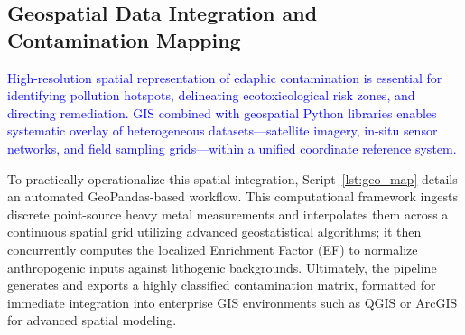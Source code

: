 \documentclass[environments,article,submit,pdftex,moreauthors]{Definitions/mdpi}
\begin{document}
\subsection{Geospatial Data Integration and Contamination Mapping}\label{sec2.3}

\textcolor{blue}{High-resolution spatial representation of edaphic contamination is essential for identifying pollution hotspots, delineating ecotoxicological risk zones, and directing remediation. GIS combined with geospatial Python libraries enables systematic overlay of heterogeneous datasets---satellite imagery, in-situ sensor networks, and field sampling grids---within a unified coordinate reference system.} 

To practically operationalize this spatial integration, Script~\ref{lst:geo_map} details an automated GeoPandas-based workflow. This computational framework ingests discrete point-source heavy metal measurements and interpolates them across a continuous spatial grid utilizing advanced geostatistical algorithms; it then concurrently computes the localized Enrichment Factor (EF) to normalize anthropogenic inputs against lithogenic backgrounds. Ultimately, the pipeline generates and exports a highly classified contamination matrix, formatted for immediate integration into enterprise GIS environments such as QGIS or ArcGIS for advanced spatial modeling.
\end{document}
